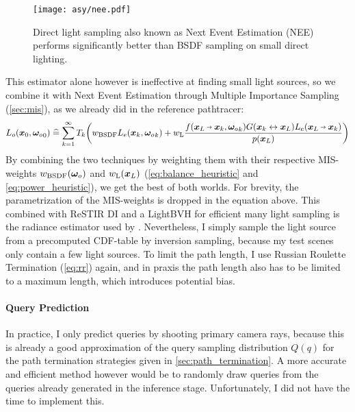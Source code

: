 \begin{figure}[ht]
    \centering
    \texttt{[image: asy/nee.pdf]}
\caption{Direct light sampling also known as Next Event Estimation (NEE) performs significantly better than BSDF sampling on small direct lighting.}
\label{fig:nee}
\end{figure}
This estimator alone however is ineffective at finding small light sources, so we combine it with Next Event Estimation through Multiple Importance Sampling (\cref{sec:mis}), as we already did in the reference pathtracer:
\begin{equation}
\begin{aligned}
    L_o(\vec{x}_0, \wo_0)
    \hateq \sum_{k=1}^{\infty} T_k \left( w_\text{BSDF} L_e(\x_k, \wo_k) + w_\text{L} \frac{f(\pdir{L}{k}, \wo_k) \G{k}{L} L_e(\pdir{L}{k})}{p(\x_L)} \right)
\end{aligned}
\end{equation}
By combining the two techniques by weighting them with their respective MIS-weights $w_\text{BSDF}({\bm{\omega}_o})$ and $w_\text{L}(\bm{x}_L)$ (\cref{eq:balance_heuristic} and \cref{eq:power_heuristic}), we get the best of both worlds.
For brevity, the parametrization of the MIS-weights is dropped in the equation above.
This combined with ReSTIR DI \parencite{bitterli2020} and a LightBVH \parencite{moreau2019} for efficient many light sampling is the radiance estimator used by \textcite{muller2021}.
Nevertheless, I simply sample the light source from a precomputed CDF-table by inversion sampling, because my test scenes only contain a few light sources.
To limit the path length, I use Russian Roulette Termination (\cref{eq:rr}) again, and in praxis the path length also has to be limited to a maximum length, which introduces potential bias.

\paragraph{Query Prediction}
In practice, I only predict queries by shooting primary camera rays, because this is already a good approximation of the query sampling distribution $Q(q)$ for the path termination strategies given in \cref{sec:path_termination}.
A more accurate and efficient method however would be to randomly draw queries from the queries already generated in the inference stage.
Unfortunately, I did not have the time to implement this.

